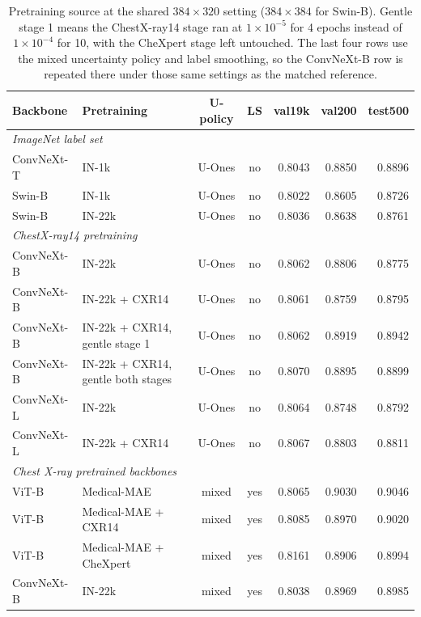 
\begin{table}[H]
  \caption{Pretraining source at the shared $384\times320$ setting
  ($384\times384$ for Swin-B). Gentle stage 1 means the ChestX-ray14
  stage ran at $1\times10^{-5}$ for 4 epochs instead of $1\times10^{-4}$
  for 10, with the CheXpert stage left untouched. The last four rows use
  the mixed uncertainty policy and label smoothing, so the ConvNeXt-B row
  is repeated there under those same settings as the matched reference.}
  \centering
  \footnotesize
  \begin{tabular}{llccrrr}
    \toprule
    Backbone & Pretraining & U-policy & LS & val19k & val200 & test500 \\
    \midrule
    \multicolumn{7}{l}{\textit{ImageNet label set}} \\
    ConvNeXt-T & IN-1k & U-Ones & no & 0.8043 & 0.8850 & 0.8896 \\
    Swin-B & IN-1k & U-Ones & no & 0.8022 & 0.8605 & 0.8726 \\
    Swin-B & IN-22k & U-Ones & no & 0.8036 & 0.8638 & 0.8761 \\
    \midrule
    \multicolumn{7}{l}{\textit{ChestX-ray14 pretraining}} \\
    ConvNeXt-B & IN-22k & U-Ones & no & 0.8062 & 0.8806 & 0.8775 \\
    ConvNeXt-B & IN-22k + CXR14 & U-Ones & no & 0.8061 & 0.8759 & 0.8795 \\
    ConvNeXt-B & IN-22k + CXR14, gentle stage 1 & U-Ones & no & 0.8062 & 0.8919 & 0.8942 \\
    ConvNeXt-B & IN-22k + CXR14, gentle both stages & U-Ones & no & 0.8070 & 0.8895 & 0.8899 \\
    ConvNeXt-L & IN-22k & U-Ones & no & 0.8064 & 0.8748 & 0.8792 \\
    ConvNeXt-L & IN-22k + CXR14 & U-Ones & no & 0.8067 & 0.8803 & 0.8811 \\
    \midrule
    \multicolumn{7}{l}{\textit{Chest X-ray pretrained backbones}} \\
    ViT-B & Medical-MAE & mixed & yes & 0.8065 & 0.9030 & 0.9046 \\
    ViT-B & Medical-MAE + CXR14 & mixed & yes & 0.8085 & 0.8970 & 0.9020 \\
    ViT-B & Medical-MAE + CheXpert & mixed & yes & 0.8161 & 0.8906 & 0.8994 \\
    ConvNeXt-B & IN-22k & mixed & yes & 0.8038 & 0.8969 & 0.8985 \\
    \bottomrule
  \end{tabular}
  \label{tab:pretrain}
\end{table}
